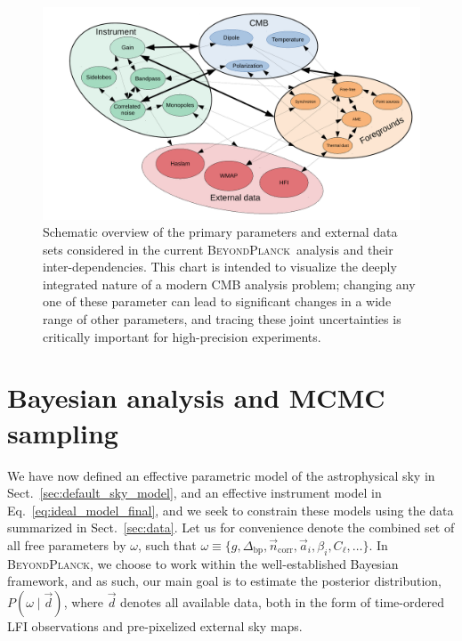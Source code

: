\documentclass[twocolumn]{aa}
\renewcommand{\d}[0]{\vec{d}}
\newcommand{\n}[0]{\vec{n}}
\renewcommand{\a}[0]{\vec{a}}
\newcommand{\Dbp}[0]{\Delta_{\mathrm{bp}}}
\newcommand{\BP}{\textsc{BeyondPlanck}}
\begin{document}
\begin{figure}[t]
	\center
	\includegraphics[width=\linewidth]{figs/BP_param_dependencies.pdf}
	\caption{Schematic overview of the primary parameters and
          external data sets considered in the current \BP\ analysis
          and their inter-dependencies. This chart is intended to
          visualize the deeply integrated nature of a modern CMB
          analysis problem; changing any one of these parameter can
          lead to significant changes in a wide range of other
          parameters, and tracing these joint uncertainties is
          critically important for high-precision experiments. }
	\label{fig:dependencies}
\end{figure}

\section{Bayesian analysis and MCMC sampling}

We have now defined an effective parametric model of the astrophysical
sky in Sect.~\ref{sec:default_sky_model}, and an effective instrument
model in Eq.~\eqref{eq:ideal_model_final}, and we seek to constrain
these models using the data summarized in Sect.~\ref{sec:data}. Let us
for convenience denote the combined set of all free parameters by
$\omega$, such that $\omega\equiv\{g,\Dbp,\n_{\mathrm{corr}}, \a_i,
\beta_i, C_{\ell},\ldots\}$. In \BP, we choose to work within the
well-established Bayesian framework, and as such, our main goal is to
estimate the posterior distribution, $P(\omega\mid \d)$, where $\d$
denotes all available data, both in the form of time-ordered LFI
observations and pre-pixelized external sky maps.
\end{document}
